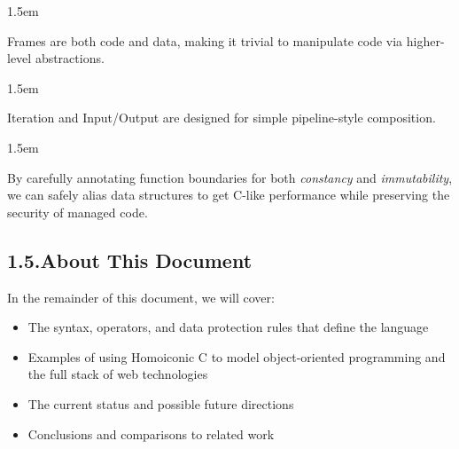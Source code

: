 \documentclass[preprint]{{sigplanconf}}
\begin{document}
\begin{mddefinitions}%


\begin{mdbmarginx}{}{}{}{1.5em}%
\begin{mddefdata}%
Frames are both code and data, making it trivial to manipulate code via higher-level abstractions.
\end{mddefdata}%
\end{mdbmarginx}%


\begin{mdbmarginx}{}{}{}{1.5em}%
\begin{mddefdata}%
Iteration and Input/Output are designed for simple pipeline-style composition.
\end{mddefdata}%
\end{mdbmarginx}%


\begin{mdbmarginx}{}{}{}{1.5em}%
\begin{mddefdata}%
By carefully annotating function boundaries for both \emph{constancy} and \emph{immutability}, we can safely
alias data structures to get C-like performance while preserving the security of managed code.%
\end{mddefdata}%
\end{mdbmarginx}%
\end{mddefinitions}%

\subsection{1.5.\hspace*{0.5em}About This Document}\label{sec-about-this-document}%

\noindent In the remainder of this document, we will cover:%

\begin{itemize}[noitemsep,topsep=\mdcompacttopsep]%

\item The syntax, operators, and data protection rules that define the language%

\item Examples of using Homoiconic C to model
object-oriented programming and the full stack of web technologies%

\item The current status and possible future directions%

\item Conclusions and comparisons to related work%
\end{itemize}%
\end{document}

